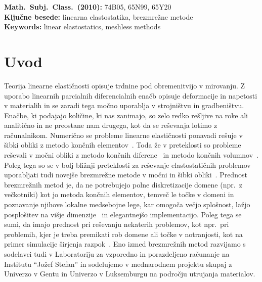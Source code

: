 \documentclass[12pt,a4paper,twoside]{article}
\theoremstyle{definition} %
\theoremstyle{plain} %
\numberwithin{equation}{section}
\begin{document}
\vfill\noindent
\textbf{Math.~Subj.~Class.~(2010):} 74B05, 65N99, 65Y20 \\[1mm]
\textbf{Ključne besede:} linearna elastostatika, brezmrežne metode \\[1mm]
\textbf{Keywords:} linear elastostatics, meshless methods


\cleardoublepage

\setcounter{page}{1}

\section{Uvod}

Teorija linearne elastičnosti opisuje trdnine pod obremenitvijo v mirovanju. Z uporabo linearnih
parcialnih diferencialnih enačb opisuje deformacije in napetosti v materialih in se zaradi tega
močno uporablja v strojništvu in gradbeništvu. Enačbe, ki podajajo količine, ki nas zanimajo,
so zelo redko rešljive na roke ali analitično in ne preostane nam drugega, kot da se reševanja
lotimo z računalnikom. Numerično se probleme linearne elastičnosti ponavadi rešuje v šibki obliki z
metodo končnih elementov~\cite{uienkiewicz2000finite}. Toda že v preteklosti so probleme reševali v
močni obliki z metodo končnih diferenc~\cite{hattel1995control} in metodo končnih
volumnov~\cite{stone2003dynamic}. Poleg tega so se v bolj bližnji preteklosti za reševanje
elastostatičnih problemov uporabljati tudi novejše brezmrežne metode v močni in šibki
obliki~\cite{chen2006meshless,mavric2015local}. Prednost brezmrežnih metod je, da ne potrebujejo
polne diskretizacije domene (npr.~z večkotniki) kot jo metoda končnih elementov, temveč le točke v
domeni in poznavanje njihove lokalne medsebojne lege, kar omogoča večjo splošnost, lažjo posplošitev
na višje dimenzije~\cite{dehghan2014numerical,li2013localized} in elegantnejšo implementacijo. Poleg
tega se sumi, da imajo prednost pri reševanju nekaterih problemov, kot npr.~pri problemih, kjer je
treba premikati rob domene ali točke v notranjosti, kot na primer simulacije širjenja
razpok~\cite{rao2000efficient}.  Eno izmed brezmrežnih metod razvijamo s sodelavci  tudi v
Laboratoriju za vzporedno in porazdeljeno računanje na Institutu ``Jožef Stefan'' in sodelujemo v
mednarodnem projektu skupaj z Univerzo v Gentu in Univerzo v Luksemburgu na področju utrujanja
materialov.
\end{document}
